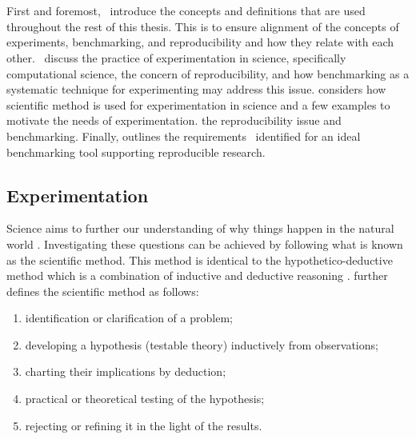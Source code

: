 \fancyhead[LE,RO]{\thepage}

\chapter{\chExperimentation}
\label{ch:experimentation}


First and foremost, \first~introduce the concepts and definitions that are used throughout the rest of this thesis.
This is to ensure alignment of the concepts of experiments, benchmarking, and reproducibility and how they relate with each other.
\First~discuss the practice of experimentation in science, specifically computational science, the concern of reproducibility, and how benchmarking as a systematic technique for experimenting may address this issue.
 considers how scientific method is used for experimentation in science and a few examples to motivate the needs of experimentation.
 the reproducibility issue and benchmarking.
Finally,  outlines the requirements \first~identified for an ideal benchmarking tool supporting reproducible research.


\section{Experimentation}
\label{sec:experimentation}

Science aims to further our understanding of why things happen in the natural world \citep{careyBeginnerGuideScientific2012}.
Investigating these questions can be achieved by following what is known as the scientific method.
This method is identical to the hypothetico-deductive method which is a combination of inductive and deductive reasoning \citep{wallimanResearchMethodsBasics2010a}.
\citeauthor{wallimanResearchMethodsBasics2010a} further defines the scientific method as follows:
\begin{enumerate}[noitemsep]
	\item identification or clarification of a problem;
	\item developing a hypothesis (testable theory) inductively from observations;
	\item charting their implications by deduction;
	\item practical or theoretical testing of the hypothesis;
	\item rejecting or refining it in the light of the results.
\end{enumerate}

